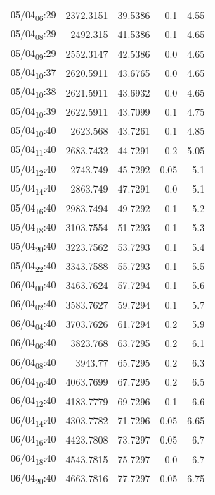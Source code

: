 \documentclass[11pt]{article}
\begin{document}
\begin{center}
\begin{tabular}{lrrrr}
05/04\textsubscript{06}:29 & 2372.3151 & 39.5386 & 0.1 & 4.55\\[0pt]
05/04\textsubscript{08}:29 & 2492.315 & 41.5386 & 0.1 & 4.65\\[0pt]
05/04\textsubscript{09}:29 & 2552.3147 & 42.5386 & 0.0 & 4.65\\[0pt]
05/04\textsubscript{10}:37 & 2620.5911 & 43.6765 & 0.0 & 4.65\\[0pt]
05/04\textsubscript{10}:38 & 2621.5911 & 43.6932 & 0.0 & 4.65\\[0pt]
05/04\textsubscript{10}:39 & 2622.5911 & 43.7099 & 0.1 & 4.75\\[0pt]
05/04\textsubscript{10}:40 & 2623.568 & 43.7261 & 0.1 & 4.85\\[0pt]
05/04\textsubscript{11}:40 & 2683.7432 & 44.7291 & 0.2 & 5.05\\[0pt]
05/04\textsubscript{12}:40 & 2743.749 & 45.7292 & 0.05 & 5.1\\[0pt]
05/04\textsubscript{14}:40 & 2863.749 & 47.7291 & 0.0 & 5.1\\[0pt]
05/04\textsubscript{16}:40 & 2983.7494 & 49.7292 & 0.1 & 5.2\\[0pt]
05/04\textsubscript{18}:40 & 3103.7554 & 51.7293 & 0.1 & 5.3\\[0pt]
05/04\textsubscript{20}:40 & 3223.7562 & 53.7293 & 0.1 & 5.4\\[0pt]
05/04\textsubscript{22}:40 & 3343.7588 & 55.7293 & 0.1 & 5.5\\[0pt]
06/04\textsubscript{00}:40 & 3463.7624 & 57.7294 & 0.1 & 5.6\\[0pt]
06/04\textsubscript{02}:40 & 3583.7627 & 59.7294 & 0.1 & 5.7\\[0pt]
06/04\textsubscript{04}:40 & 3703.7626 & 61.7294 & 0.2 & 5.9\\[0pt]
06/04\textsubscript{06}:40 & 3823.768 & 63.7295 & 0.2 & 6.1\\[0pt]
06/04\textsubscript{08}:40 & 3943.77 & 65.7295 & 0.2 & 6.3\\[0pt]
06/04\textsubscript{10}:40 & 4063.7699 & 67.7295 & 0.2 & 6.5\\[0pt]
06/04\textsubscript{12}:40 & 4183.7779 & 69.7296 & 0.1 & 6.6\\[0pt]
06/04\textsubscript{14}:40 & 4303.7782 & 71.7296 & 0.05 & 6.65\\[0pt]
06/04\textsubscript{16}:40 & 4423.7808 & 73.7297 & 0.05 & 6.7\\[0pt]
06/04\textsubscript{18}:40 & 4543.7815 & 75.7297 & 0.0 & 6.7\\[0pt]
06/04\textsubscript{20}:40 & 4663.7816 & 77.7297 & 0.05 & 6.75\\[0pt]

\end{tabular}
\end{center}
\end{document}
